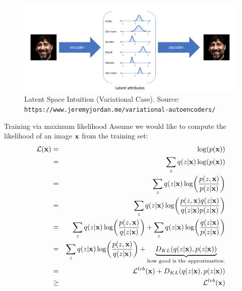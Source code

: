 \documentclass[handout,xcolor=pdftex,dvipsnames,table,mathserif]{beamer}
\begin{document}
\begin{frame}
\begin{figure}
\includegraphics[width=.95\columnwidth]{../graphics/LatentSpaceIntuition}
\caption{Latent Space Intuition (\alert{Variational Case}). Source: \texttt{https://www.jeremyjordan.me/variational-autoencoders/}}
\end{figure}
\end{frame}

\begin{frame}{Training via maximum likelihood}
Assume we would like to compute the likelihood of an image $\mathbf{x}$ from the training set:
\begin{eqnarray*}
\mathcal{L}(\mathbf{x}) &=&\log(p(\mathbf{x})) \\
&=& \sum_{z} q(z|\mathbf{x}) \log(p(\mathbf{x})) \\
&=& \sum_{z} q(z|\mathbf{x}) \log(\frac{p(z,\mathbf{x})}{p(z | \mathbf{x})}) \\
&=& \sum_{z} q(z|\mathbf{x}) \log(\frac{p(z,\mathbf{x}) q(z|\mathbf{x})}{q(z|\mathbf{x}) p(z | \mathbf{x})}) \\
&=&  \sum_{z} q(z|\mathbf{x}) \log(\frac{p(z,\mathbf{x}) }{q(z|\mathbf{x})}) + \sum_{z} q(z|\mathbf{x}) \log(\frac{q(z|\mathbf{x}) }{p(z|\mathbf{x})}) \\
&=& \sum_{z} q(z|\mathbf{x}) \log(\frac{p(z,\mathbf{x}) }{q(z|\mathbf{x})})+ \underbrace{D_{KL}(q(z|\mathbf{x}),p(z|\mathbf{x}))}_{\text{how good is the approximation.}}\\
&=& \mathcal{L}^{lvb}(\mathbf{x})+D_{KL}(q(z|\mathbf{x}),p(z|\mathbf{x})) \\
&\geq& \mathcal{L}^{lvb}(\mathbf{x})
\end{eqnarray*}
\end{frame}
\end{document}
